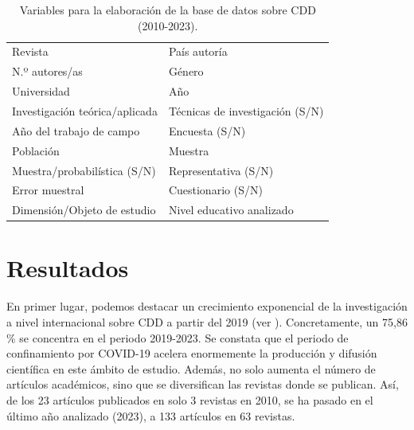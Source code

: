 \documentclass[spanish]{textolivre}
\begin{document}
\begin{table}[h!]
\centering
\begin{threeparttable}
\caption{Variables para la elaboración de la base de datos sobre CDD (2010-2023).}
\begin{tabular}{@{}ll@{}}
\toprule
Revista & País autoría \\

N.º autores/as & Género \\

Universidad & Año \\

Investigación teórica/aplicada & Técnicas de investigación (S/N) \\

Año del trabajo de campo & Encuesta (S/N) \\

Población & Muestra \\

Muestra/probabilística (S/N) & Representativa (S/N) \\

Error muestral & Cuestionario (S/N) \\

Dimensión/Objeto de estudio & Nivel educativo analizado \\
\bottomrule
\end{tabular}
\label{tab-2}
\end{threeparttable}
\end{table}

\section{Resultados}\label{sec-3}
En primer lugar, podemos destacar un crecimiento exponencial de la investigación a nivel internacional sobre CDD a partir del 2019 (ver ). Concretamente, un 75,86 \% se concentra en el periodo 2019-2023. Se constata que el periodo de confinamiento por COVID-19 acelera enormemente la producción y difusión científica en este ámbito de estudio. Además, no solo aumenta el número de artículos académicos, sino que se diversifican las revistas donde se publican. Así, de los 23 artículos publicados en solo 3 revistas en 2010, se ha pasado en el último año analizado (2023), a 133 artículos en 63 revistas.
\end{document}
